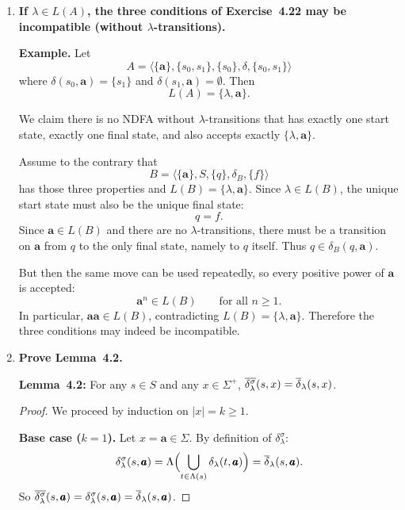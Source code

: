 \begin{enumerate}[{4.}1.]
\item \textbf{If $\lambda\in L(A)$, the three conditions of Exercise~4.22
may be incompatible (without $\lambda$-transitions).}

\textbf{Example.}  Let
\[
A=\langle\{\pmb{a}\},\{s_0,s_1\},\{s_0\},\delta,\{s_0,s_1\}\rangle
\]
where $\delta(s_0,\pmb{a})=\{s_1\}$ and $\delta(s_1,\pmb{a})=\emptyset$.  Then
\[
L(A)=\{\lambda,\pmb{a}\}.
\]

We claim there is no NDFA without $\lambda$-transitions that has exactly one
start state, exactly one final state, and also accepts exactly
$\{\lambda,\pmb{a}\}$.

Assume to the contrary that
\[
B=\langle\{\pmb{a}\},S,\{q\},\delta_B,\{f\}\rangle
\]
has those three properties and $L(B)=\{\lambda,\pmb{a}\}$.  Since $\lambda\in
L(B)$, the unique start state must also be the unique final state:
\[
q=f.
\]
Since $\pmb{a}\in L(B)$ and there are no $\lambda$-transitions, there must be a
transition on $\pmb{a}$ from $q$ to the only final state, namely to $q$
itself.  Thus $q\in\delta_B(q,\pmb{a})$.

But then the same move can be used repeatedly, so every positive power of
$\pmb{a}$ is accepted:
\[
\pmb{a}^n\in L(B)\qquad\text{for all }n\geq 1.
\]
In particular, $\pmb{aa}\in L(B)$, contradicting $L(B)=\{\lambda,\pmb{a}\}$.
Therefore the three conditions may indeed be incompatible.

\item \textbf{Prove Lemma~4.2.}

\textbf{Lemma~4.2:} For any $s\in S$ and any $x\in\Sigma^+$,
$\overline{\delta^{\sigma}_\lambda}(s,x)=\overline{\delta}_\lambda(s,x)$.

\begin{proof}
We proceed by induction on $|x|=k\ge 1$.

\textbf{Base case ($k=1$).}  Let $x=\pmb{a}\in\Sigma$.  By definition of
$\delta^{\sigma}_\lambda$:
\[
  \delta^{\sigma}_\lambda(s,\pmb{a})
  =\Lambda \Bigl(\bigcup_{t\in\Lambda(s)}\delta_\lambda(t,\pmb{a})\Bigr)
  =\overline{\delta}_\lambda(s,\pmb{a}).
\]
So $\overline{\delta^{\sigma}_\lambda}(s,\pmb{a})=\delta^{\sigma}_\lambda(s,\pmb{a})=\overline{\delta}_\lambda(s,\pmb{a})$.


\end{proof}
\end{enumerate}
